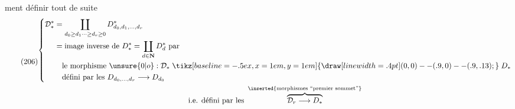 ment définir tout de suite
\[
\tag{206}
\begin{gathered}
\left\{\begin{aligned}
\mathcal D_*^*&=\coprod_{d_0\geq d_1\cdots\geq d_r\geq0}D^*_{d_0,d_1,\ldots,d_r}\\
&=\text{image inverse de }D_*^*=\coprod_{d\in\mathbf N}D_d^*\text{ par}\\
&\quad\text{le morphisme }\unsure{0|o}:\mathcal D_*\mathrel{\tikz[baseline=-.5ex,x=1em,y=1em]{\draw[line width=.4pt] (0,0)--(.9,0)--(.9,.13);}} D_*\\
&\quad\text{défini par les }D_{d_0,\ldots,d_r}\longrightarrow D_{d_0}
\end{aligned}\right.\\
\text{i.e. défini par les }\overbrace{\mathcal D_r\longrightarrow D_*}^{\inserted{\text{morphismes ``premier sommet''}}}
\end{gathered}
\]

